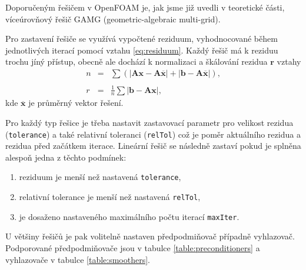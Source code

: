 \documentclass[a4paper,12pt]{report}
\theoremstyle{remark}
\begin{document}
	Doporučeným řešičem v OpenFOAM je, jak jsme již uvedli v teoretické části,  víceúrovňový řešič GAMG (geometric-algebraic multi-grid).

	Pro zastavení řešiče se využívá vypočtené reziduum, vyhodnocované během jednotlivých iterací pomocí vztahu \eqref{eq:residuum}. Každý řešič má k reziduu trochu jíný přístup, obecně ale dochází k normalizaci a škálování rezidua $\boldsymbol{r}$ vztahy
\begin{eqnarray}
n &=& \sum \left( | \boldsymbol{A} \boldsymbol{x} - \boldsymbol{A} \overline{\boldsymbol{x}} | + | \boldsymbol{b} - \boldsymbol{A} \overline{\boldsymbol{x}} | \right), \nonumber \\
 \nonumber \\
r &=& \frac{1}{n} \sum | \boldsymbol{b} - \boldsymbol{A} \boldsymbol{x} |,
\end{eqnarray}
kde $\overline{\boldsymbol{x}}$ je průměrný vektor řešení.  

Pro každý typ řešice je třeba nastavit zastavovací parametr pro velikost rezidua (\texttt{tolerance}) a také relativní toleranci (\texttt{relTol}) což je poměr aktuálního rezidua a rezidua před začátkem iterace. Lineární řešič se následně zastaví pokud je splněna alespoň jedna z těchto podmínek:
\begin{enumerate}
	\item reziduum je menší než nastavená \texttt{tolerance},
	\item relativní tolerance je menší než nastavená \texttt{relTol},
	\item je dosaženo nastaveného maximálního počtu iterací \texttt{maxIter}.
\end{enumerate}




U většiny řešičů je pak volitelně nastaven předpodmiňovač případně vyhlazovač. Podporované předpodmiňovače jsou v tabulce \ref{table:preconditioners} a vyhlazovače v tabulce \ref{table:smoothers}.
\end{document}
